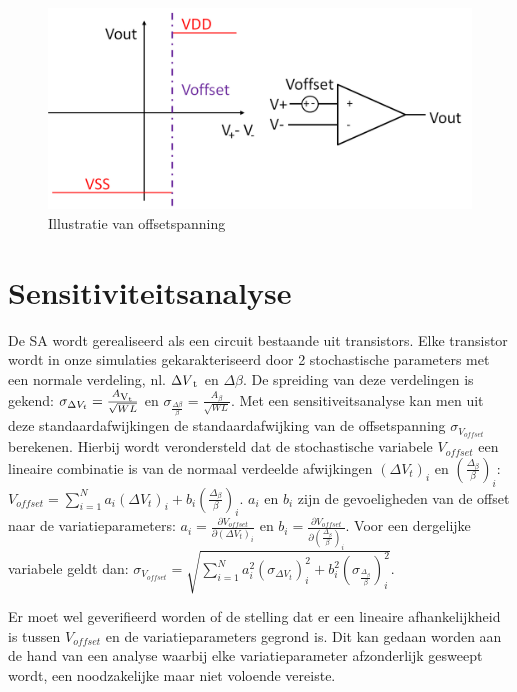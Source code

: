\begin{figure}
  \centering
  \includegraphics[scale=0.4]{../fig/hfdstk-sensamp-offset.png}
  \caption[SA offsetspanning]{Illustratie van offsetspanning}
  \label{fig:offset}
\end{figure}

\section{Sensitiviteitsanalyse}
De SA wordt gerealiseerd als een circuit bestaande uit transistors. Elke transistor wordt in onze simulaties gekarakteriseerd door 2 stochastische parameters met een normale verdeling, nl. $\Delta V\textsubscript{t}$ en $\Delta \beta$. De spreiding van deze verdelingen is gekend: $\sigma_{\Delta V_{t}} = \frac{A\textsubscript{V\textsubscript{t}}}{\sqrt{W L}}$ en $\sigma_\frac{{\Delta \beta}}{\beta} = \frac{A_{\beta}}{\sqrt{W L}}$. Met een sensitiveitsanalyse kan men uit deze standaardafwijkingen de standaardafwijking van de offsetspanning $\sigma_{V_{offset}}$ berekenen. Hierbij wordt verondersteld dat de stochastische variabele $V_{offset}$ een lineaire combinatie is van de normaal verdeelde afwijkingen $(\Delta V_{t})_{i}$ en $(\frac{\Delta_{\beta}}{\beta})_{i}$: $V_{offset}=\sum\limits_{i=1}^{N} a_{i} (\Delta V_{t})_{i} + b_{i} (\frac{\Delta_{\beta}}{\beta})_{i}$.
$a_{i}$ en $b_{i}$ zijn de gevoeligheden van de offset naar de variatieparameters: $a_{i}=\frac{\partial V_{offset}}{\partial (\Delta V_{t})_{i}}$ en $b_{i}=\frac{\partial V_{offset}}{\partial (\frac{\Delta_{\beta}}{\beta})_{i}}$.
Voor een dergelijke variabele geldt dan: $\sigma_{V_{offset}}=\sqrt{\sum\limits_{i=1}^{N} a_{i}^{2} (\sigma_{\Delta V_{t}})_{i}^{2} + b_{i}^{2} (\sigma_{\frac{\Delta_{\beta}}{\beta}})_{i}^{2}}$.

Er moet wel geverifieerd worden of de stelling dat er een lineaire afhankelijkheid is tussen $V_{offset}$ en de variatieparameters gegrond is.
Dit kan gedaan worden aan de hand van een analyse waarbij elke variatieparameter afzonderlijk gesweept wordt, een noodzakelijke maar niet voloende vereiste.

